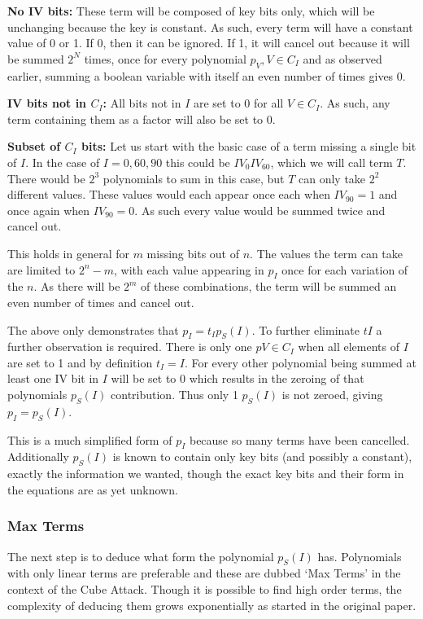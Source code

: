\documentclass{report}
\let\Oldsubsubsection\subsubsection
\renewcommand{\subsubsection}{\FloatBarrier\Oldsubsubsection}
\begin{document}
\textbf{No IV bits:}
These term will be composed of key bits only, which will be unchanging because the key is constant. As such, every term will have a constant value of 0 or 1. If 0, then it can be ignored. If 1, it will cancel out because it will be summed $2^N$ times, once for every polynomial $p_V, V \in C_I$ and as observed earlier, summing a boolean variable with itself an even number of times gives 0.

\textbf{IV bits not in $C_I$:}
All bits not in $I$ are set to 0 for all $V \in C_I$. As such, any term containing them as a factor will also be set to 0.

\textbf{Subset of $C_I$ bits:}
Let us start with the basic case of a term missing a single bit of $I$. In the case of $I={0, 60, 90}$ this could be $IV_0IV_{60}$, which we will call term $T$. There would be $2^3$ polynomials to sum in this case, but $T$ can only take $2^2$ different values. These values would each appear once each when $IV_{90} = 1$ and once again when $IV_{90} = 0$. As such every value would be summed twice and cancel out.

This holds in general for $m$ missing bits out of $n$. The values the term can take are limited to $2^n-m$, with each value appearing in $p_I$ once for each variation of the $n$. As there will be $2^m$ of these combinations, the term will be summed an even number of times and cancel out. 

The above only demonstrates that $p_I=t_Ip_S(I)$. To further eliminate $tI$ a further observation is required. There is only one $pV \in C_I$ when all elements of $I$ are set to 1 and by definition $t_I=I$. For every other polynomial being summed at least one IV bit in $I$ will be set to 0 which results in the zeroing of that polynomials $p_S(I)$ contribution. Thus only 1 $p_S(I)$ is not zeroed, giving $p_I=p_S(I)$.

This is a much simplified form of $p_I$ because so many terms have been cancelled. Additionally $p_S(I)$ is known to contain only key bits (and possibly a constant), exactly the information we wanted, though the exact key bits and their form in the equations are as yet unknown.

\subsubsection{Max Terms}
The next step is to deduce what form the polynomial $p_S(I)$ has. Polynomials with only linear terms are preferable and these are dubbed `Max Terms' in the context of the Cube Attack. Though it is possible to find high order terms, the complexity of deducing them grows exponentially as started in the original paper\cite{DinurShamir2009}.
\end{document}

